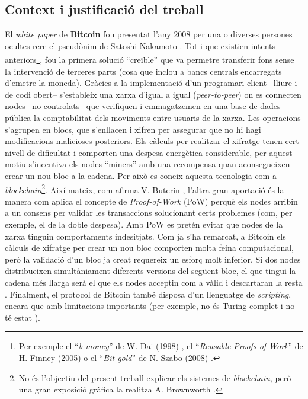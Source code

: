 \documentclass[11pt,a4paper]{article}
\begin{document}
\subsection{Context i justificació del treball}
\label{sub:context}
El \textit{white paper} de \textbf{Bitcoin} fou presentat l'any 2008 per una o diverses persones ocultes rere el pseudònim de Satoshi Nakamoto \cite{nakamoto2008}. Tot i que existien intents anteriors\footnote{Per exemple el ``\textit{b-money}'' de W. Dai (1998) \cite{dai1998}, el ``\textit{Reusable Proofs of Work}'' de H. Finney (2005) \cite{finney2005} o el ``\textit{Bit gold}'' de N. Szabo (2008) \cite{szabo2008}.}, fou la primera solució ``creïble'' \cite{vuterin2014} que va permetre transferir fons sense la intervenció de terceres parts (cosa que inclou a bancs centrals encarregats d'emetre la moneda). Gràcies a la implementació d'un programari client –lliure i de codi obert– s'estableix una xarxa d'igual a igual (\textit{peer-to-peer}) on es connecten nodes –no controlats– que verifiquen i emmagatzemen en una base de dades pública la comptabilitat dels moviments entre usuaris de la xarxa. Les operacions s'agrupen en blocs, que s'enllacen i xifren per assegurar que no hi hagi modificacions malicioses posteriors. Els càlculs per realitzar el xifratge tenen cert nivell de dificultat i comporten una despesa energètica considerable, per aquest motiu s'incentiva els nodes ``miners'' amb una recompensa quan aconsegueixen crear un nou bloc a la cadena. Per això es coneix aquesta tecnologia com a \textit{blockchain}\footnote{No és l'objectiu del present treball explicar els sistemes de \textit{blockchain}, però una gran exposició gràfica la realitza A. Brownworth \cite{brownworth1}\cite{brownworth2}.}. Així mateix, com afirma V. Buterin \cite{vuterin2014}, l'altra gran aportació és la manera com aplica el concepte de \textit{Proof-of-Work} (PoW) perquè els nodes arribin a un consens per validar les transaccions solucionant certs problemes (com, per exemple, el de la doble despesa). Amb PoW es pretén evitar que nodes de la xarxa tinguin comportaments indesitjats. Com ja s'ha remarcat, a Bitcoin els càlculs de xifratge per crear un nou bloc comporten molta feina computacional, però la validació d'un bloc ja creat requereix un esforç molt inferior. Si dos nodes distribueixen simultàniament diferents versions del següent bloc, el que tingui la cadena més llarga serà el que els nodes acceptin com a vàlid i descartaran la resta \cite{nakamoto2008}. Finalment, el protocol de Bitcoin també disposa d'un llenguatge de \textit{scripting}, encara que amb limitacions importants (per exemple, no és Turing complet i no té estat \cite{vuterin2014}). 
\end{document}
